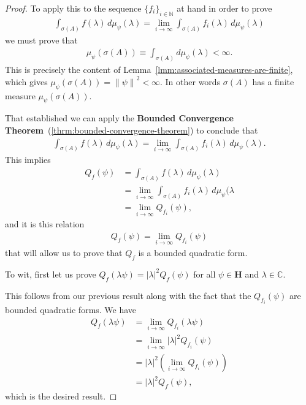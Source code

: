 \begin{proof}
To apply this to the sequence $\{ f_i \}_{i \in \mathbb{N}}$ at hand in order to prove
\begin{align}
    \int_{\sigma(A)} f(\lambda) \, d\mu_\psi(\lambda) = \lim\limits_{i \rightarrow \infty} \int_{\sigma(A)} f_i(\lambda) \, d\mu_\psi(\lambda)
\end{align}
we must prove that
\begin{align}
    \mu_\psi(\sigma(A)) \equiv \int_{\sigma(A)} d\mu_\psi(\lambda) < \infty.
\end{align}
This is precisely the content of Lemma~\ref{lmm:associated-measures-are-finite}, which gives $\mu_\psi(\sigma(A)) = \left\| \psi \right\|^2 < \infty$. In other words $\sigma(A)$ has a finite measure $\mu_\psi(\sigma(A))$.

That established we can apply the \textbf{Bounded Convergence Theorem}~(\ref{thrm:bounded-convergence-theorem}) to conclude that
\begin{align}
    \int_{\sigma(A)} f(\lambda) \, d\mu_\psi(\lambda) = \lim\limits_{i \rightarrow \infty} \int_{\sigma(A)} f_i(\lambda) \, d\mu_\psi(\lambda).
\end{align}
This implies
\begin{align}
    Q_f(\psi) &= \int_{\sigma(A)} f(\lambda) \, d\mu_\psi(\lambda) \\
              &= \lim\limits_{i \rightarrow \infty} \int_{\sigma(A)} f_i(\lambda) \, d\mu_\psi(\lambda \\
              &= \lim\limits_{i \rightarrow \infty} Q_{f_i}(\psi),
\end{align}
and it is this relation
\begin{align}
    Q_f(\psi) = \lim\limits_{i \rightarrow \infty} Q_{f_i}(\psi)
\end{align}
that will allow us to prove that $Q_f$ is a bounded quadratic form.

To wit, first let us prove $Q_f(\lambda\psi) = \lvert\lambda \rvert^2 Q_f(\psi)$ for all $\psi \in \mathbf{H}$ and $\lambda \in \mathbb{C}$.

This follows from our previous result along with the fact that the $Q_{f_i}(\psi)$ are bounded quadratic forms. We have
\begin{align}
    Q_f(\lambda\psi) &= \lim\limits_{i \rightarrow \infty} Q_{f_i}(\lambda\psi) \\
                     &= \lim\limits_{i \rightarrow \infty} \lvert\lambda \rvert^2 Q_{f_i}(\psi) \\
                     &= \lvert\lambda \rvert^2 \left( \lim\limits_{i \rightarrow \infty} Q_{f_i}(\psi) \right) \\
                     &= \lvert\lambda \rvert^2 Q_f(\psi),
\end{align}
which is the desired result.


\end{proof}
